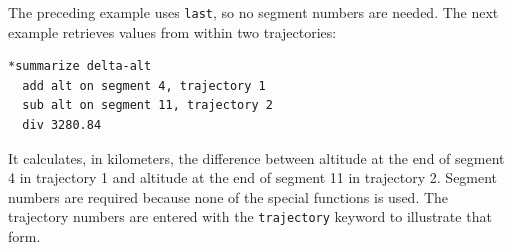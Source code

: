 The preceding example uses \texttt{last}, so no segment numbers are needed. The
next example retrieves values from within two trajectories:

\begin{lstlisting}[style=taosmanual]
*summarize delta-alt
  add alt on segment 4, trajectory 1
  sub alt on segment 11, trajectory 2
  div 3280.84
\end{lstlisting}

It calculates, in kilometers, the difference between altitude at the end of segment 4
in trajectory 1 and altitude at the end of segment 11 in trajectory 2. Segment numbers
are required because none of the special functions is used. The trajectory numbers
are entered with the \texttt{trajectory} keyword to illustrate that form.
